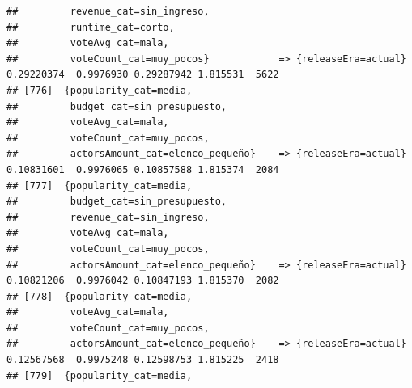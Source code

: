 \documentclass[
]{article}
\begin{document}
\begin{verbatim}
##         revenue_cat=sin_ingreso,                                                                                                
##         runtime_cat=corto,                                                                                                      
##         voteAvg_cat=mala,                                                                                                       
##         voteCount_cat=muy_pocos}            => {releaseEra=actual}               0.29220374  0.9976930 0.29287942 1.815531  5622
## [776]  {popularity_cat=media,                                                                                                   
##         budget_cat=sin_presupuesto,                                                                                             
##         voteAvg_cat=mala,                                                                                                       
##         voteCount_cat=muy_pocos,                                                                                                
##         actorsAmount_cat=elenco_pequeño}    => {releaseEra=actual}               0.10831601  0.9976065 0.10857588 1.815374  2084
## [777]  {popularity_cat=media,                                                                                                   
##         budget_cat=sin_presupuesto,                                                                                             
##         revenue_cat=sin_ingreso,                                                                                                
##         voteAvg_cat=mala,                                                                                                       
##         voteCount_cat=muy_pocos,                                                                                                
##         actorsAmount_cat=elenco_pequeño}    => {releaseEra=actual}               0.10821206  0.9976042 0.10847193 1.815370  2082
## [778]  {popularity_cat=media,                                                                                                   
##         voteAvg_cat=mala,                                                                                                       
##         voteCount_cat=muy_pocos,                                                                                                
##         actorsAmount_cat=elenco_pequeño}    => {releaseEra=actual}               0.12567568  0.9975248 0.12598753 1.815225  2418
## [779]  {popularity_cat=media,                                                                                                   

\end{verbatim}
\end{document}
